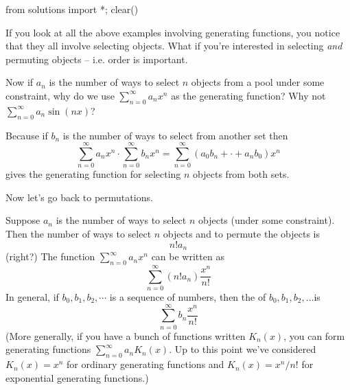 \begin{python0}
from solutions import *; clear() 
\end{python0}

If you look at all the above examples involving generating functions, 
you notice that they all involve selecting objects.
What if you're interested in selecting \textit{and} permuting
objects -- i.e. order is important.

Now if $a_n$ is the number of ways to select $n$ objects from a pool
under some constraint, why do we use $\sum_{n=0}^\infty a_n x^n$
as the generating function?
Why not $\sum_{n=0}^\infty a_n \sin(nx)$?

Because if $b_n$ is the number of ways to select from another set
then 
\[
\sum_{n=0}^\infty a_n x^n \cdot \sum_{n=0}^\infty b_n x^n
= \sum_{n=0}^\infty (a_0b_n + \cdot + a_n b_0) x^n
\]
gives the generating function for selecting $n$ objects from both sets.

Now let's go back to permutations.

Suppose $a_n$ is the number of ways to select $n$ objects (under some
constraint). 
Then the number of ways to select $n$ objects and to permute the objects
is
\[
n! a_n
\]
(right?)
The function $\sum_{n=0}^\infty a_n x^n$ can be written as
\[
\sum_{n=0}^\infty (n!a_n) \frac{x^n}{n!}
\]
In general, if $b_0, b_1, b_2, \cdots$ is a sequence of numbers, then the 
 of $b_0, b_1, b_2, \ldots$is 
\[
\sum_{n=0}^\infty b_n \frac{x^n}{n!}
\]
(More generally, if you have a bunch of functions written
$K_n(x)$, you can form generating functions
$\sum_{n=0}^\infty a_n K_n(x)$.
Up to this point we've considered $K_n(x) = x^n$ for
ordinary generating functions and $K_n(x) = x^n/n!$ for 
exponential generating functions.)


